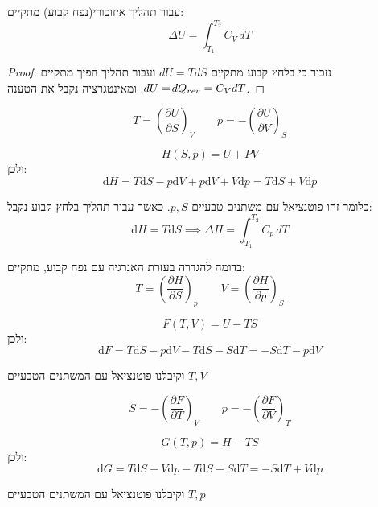 \documentclass{tstextbook}
\begin{document}
\begin{proposition}
עבור תהליך איזוכורי(נפח קבוע) מתקיים:
$$\Delta U = \int_{T_{1}}^{T_{2}} C_{V} \, dT $$

\end{proposition}
\begin{proof}
נזכור כי בלחץ קבוע מתקיים \(dU=TdS\) ועבור תהליך הפיך מתקיים \(dU=\;\bar{}\mkern-7.5mu dQ_{rev}=C_{V}dT\). ומאינטגרציה נקבל את הטענה.

\end{proof}
\begin{proposition}
$$T=\left(\frac{\partial U}{\partial S}\right)_{V}\qquad p=-\left(\frac{\partial U}{\partial V}\right)_{S}$$

\end{proposition}
\begin{definition}[אנטלפיה]
$$H(S,p)=U+PV$$
ולכן:
$$\mathrm{d}H=T\mathrm{d}S-p\mathrm{d}V+p\mathrm{d}V+V\mathrm{d}p=T\mathrm{d}S+V\mathrm{d}p$$

\end{definition}
כלומר זהו פוטנציאל עם משתנים טבעיים \(p,S\).
כאשר עבור תהליך בלחץ קבוע נקבל: 
$$\mathrm{d}H=T\mathrm{d}S\implies \Delta H = \int_{T_{1}}^{T_{2}} C_{p} \, dT$$

\begin{corollary}
בדומה להגדרה בעזרת האנרגיה עם נפח קבוע, מתקיים:
$$T=\left(\frac{\partial H}{\partial S}\right)_{p}\qquad V=\left(\frac{\partial H}{\partial p}\right)_{S}$$

\end{corollary}
\begin{definition}
$$F(T,V)=U-TS$$
ולכן:
$$\mathrm{d}F=T\mathrm{d}S-p\mathrm{d}V-T\mathrm{d}S-S\mathrm{d}T=-S\mathrm{d}T-p\mathrm{d}V$$

\end{definition}
וקיבלנו פוטנציאל עם המשתנים הטבעיים \(T,V\)

\begin{corollary}
$$S=-\left(\frac{\partial F}{\partial T}\right)_{V}\qquad p=-\left({\frac{\partial F}{\partial V}}\right)_{T}$$

\end{corollary}
\begin{definition}
$$G(T,p)=H-TS$$
ולכן:
$$\mathrm{d}G=T\mathrm{d}S+V\mathrm{d}p-T\mathrm{d}S-S\mathrm{d}T=-S\mathrm{d}T+V\mathrm{d}p$$

\end{definition}
וקיבלנו פוטנציאל עם המשתנים הטבעיים \(T,p\)
\end{document}
